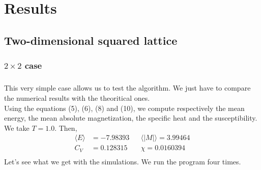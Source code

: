 \documentclass[a4paper, twoside, 11pt]{report}
\theoremstyle{theorem}
\theoremstyle{remark}
\theoremstyle{exemple}
\begin{document}
\chapter{Results}

    \section{Two-dimensional squared lattice}
    
        \subsection{$2\times2$ case}
        
            \paragraph{}This very simple case allows us to test the algorithm. We just have to compare the numerical results with the theoritical ones.\\
            Using the equations (5), (6), (8) and (10), we compute respectively the mean energy, the mean absolute magnetization, the specific heat and the susceptibility. We take $T=1.0$.
            Then,
                \begin{align*}
                    \langle E \rangle &= -7.98393  
                    && \langle |M| \rangle = 3.99464 \\
                    C_V &= 0.128315
                    &&\chi = 0.0160394\\
                \end{align*}
            Let's see what we get with the simulations. We run the program four times. 
\end{document}
